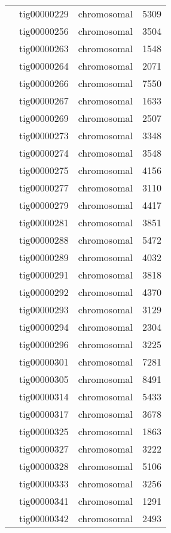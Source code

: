 {\begin{supertabular}{llcr}
         & tig00000229 & chromosomal & 5309 \\
         & tig00000256 & chromosomal & 3504 \\
         & tig00000263 & chromosomal & 1548 \\
         & tig00000264 & chromosomal & 2071 \\
         & tig00000266 & chromosomal & 7550 \\
         & tig00000267 & chromosomal & 1633 \\
         & tig00000269 & chromosomal & 2507 \\
         & tig00000273 & chromosomal & 3348 \\
         & tig00000274 & chromosomal & 3548 \\
         & tig00000275 & chromosomal & 4156 \\
         & tig00000277 & chromosomal & 3110 \\
         & tig00000279 & chromosomal & 4417 \\
         & tig00000281 & chromosomal & 3851 \\
         & tig00000288 & chromosomal & 5472 \\
         & tig00000289 & chromosomal & 4032 \\
         & tig00000291 & chromosomal & 3818 \\
         & tig00000292 & chromosomal & 4370 \\
         & tig00000293 & chromosomal & 3129 \\
         & tig00000294 & chromosomal & 2304 \\
         & tig00000296 & chromosomal & 3225 \\
         & tig00000301 & chromosomal & 7281 \\
         & tig00000305 & chromosomal & 8491 \\
         & tig00000314 & chromosomal & 5433 \\
         & tig00000317 & chromosomal & 3678 \\
         & tig00000325 & chromosomal & 1863 \\
         & tig00000327 & chromosomal & 3222 \\
         & tig00000328 & chromosomal & 5106 \\
         & tig00000333 & chromosomal & 3256 \\
         & tig00000341 & chromosomal & 1291 \\
         & tig00000342 & chromosomal & 2493 \\

\end{supertabular}}
